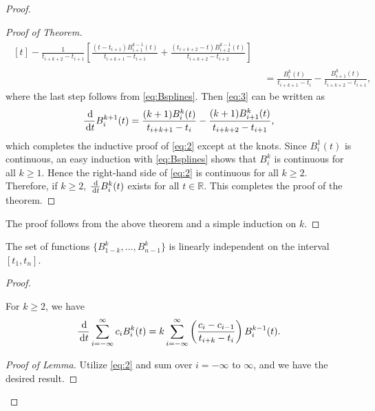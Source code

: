 \begin{sol}
\begin{proof}
\begin{proof}[Proof of Theorem]
\begin{align*}
\begin{multlined}[t]
         - \frac{1}{t_{i+k+2}-t_{i+1}}\left[\frac{(t-t_{i+1})B_{i+1}^{k-1}(t)}{t_{i+k+1}-t_{i+1}}
         + \frac{(t_{i+k+2}-t)B_{i+2}^{k-1}(t)}{t_{i+k+2}-t_{i+2}}\right] 
     \end{multlined}
  \\
  &= \frac{B_i^k(t)}{t_{i+k+1}-t_i} - \frac{B_{i+1}^k(t)}{t_{i+k+2}-t_{i+1}},
\end{align*}
where the last step follows from \eqref{eq:Bsplines}.
Then \eqref{eq:3} can be written as
\begin{displaymath}
  \frac{\,\mathrm{d}}{\,\mathrm{d} t}B_i^{k+1}(t) = \frac{(k+1)B_i^k(t)}{t_{i+k+1}-t_i} -
  \frac{(k+1)B_{i+1}^k(t)}{t_{i+k+2}-t_{i+1}},
\end{displaymath}
which completes the inductive proof of \eqref{eq:2} except at the knots.
Since $B_i^1(t)$ is continuous,
an easy induction with \eqref{eq:Bsplines} shows that $B_i^k$ is
continuous for all $k\ge 1$.
Hence the right-hand side of \eqref{eq:2} is continuous for all $k\ge 2$.
Therefore,
if $k\ge 2$, $\frac{\,\mathrm{d}}{\,\mathrm{d} t}B_i^k(t)$ exists for all $t\in\mathbb{R}$.
This completes the proof of the theorem.
\end{proof}
The proof follows from the above theorem and a simple induction on $k$.
  \end{proof}

  \begin{prop}
    The set of functions $\{B_{1-k}^k, \ldots, B_{n-1}^k\}$
    is linearly independent on the interval $[t_1, t_n]$.
  \end{prop}
  \begin{proof}
    \begin{lem}
      For $k\ge 2$, we have
      \begin{equation}
        \label{eq:4}
        \frac{\,\mathrm{d}}{\,\mathrm{d} t}\sum_{i=-\infty}^{\infty}c_iB_i^k(t) =
        k\sum_{i=-\infty}^{\infty}\left( \frac{c_i-c_{i-1}}{t_{i+k}-t_i}\right)
        B_i^{k-1}(t).
      \end{equation}
    \end{lem}
    \begin{proof}[Proof of Lemma]
      Utilize \eqref{eq:2} and sum over $i=-\infty$ to $\infty$,
      and we have the desired result.
    \end{proof}
    

\end{proof}
\end{sol}
